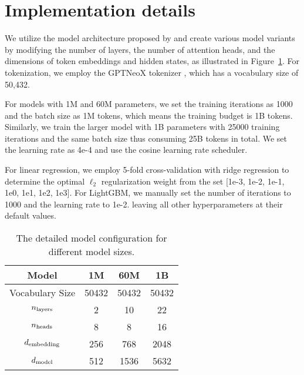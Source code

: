 \section{Implementation details}
\label{appendix:implement}
We utilize the model architecture proposed by \citet{zhang2024tinyllama} and create various model variants by modifying the number of layers, the number of attention heads, and the dimensions of token embeddings and hidden states, as illustrated in Figure~\ref{tab:model_config}.
For tokenization, we employ the GPTNeoX tokenizer \citep{black2022gpt}, which has a vocabulary size of 50,432.

For models with 1M and 60M parameters, we set the training iterations as 1000 and the batch size as 1M tokens, which means the training budget is 1B tokens.
Similarly, we train the larger model with 1B parameters with 25000 training iterations and the same batch size thus consuming 25B tokens in total.
We set the learning rate as 4e-4 and use the cosine learning rate scheduler.

For linear regression, we employ 5-fold cross-validation with ridge regression to determine the optimal $\ell_2$ regularization weight from the set [1e-3, 1e-2, 1e-1, 1e0, 1e1, 1e2, 1e3].
For LightGBM, we manually set the number of iterations to 1000 and the learning rate to 1e-2.
leaving all other hyperparameters at their default values.



\begin{table}[htbp]
    \centering
    \caption{The detailed model configuration for different model sizes.}
    \label{tab:model_config}
    \begin{tabular}{cccc}
        \toprule
        \textbf{Model} & \textbf{1M} & \textbf{60M} & \textbf{1B} \\
        \midrule
        Vocabulary Size & 50432 & 50432 & 50432 \\
        $n_{\rm layers}$ & 2 & 10 & 22 \\
        $n_{\rm heads}$ & 8 & 8 & 16 \\
        $d_{\rm embedding}$ & 256 & 768 & 2048 \\
        $d_{\rm model}$ & 512 & 1536 & 5632 \\
        \bottomrule
    \end{tabular}
\end{table}